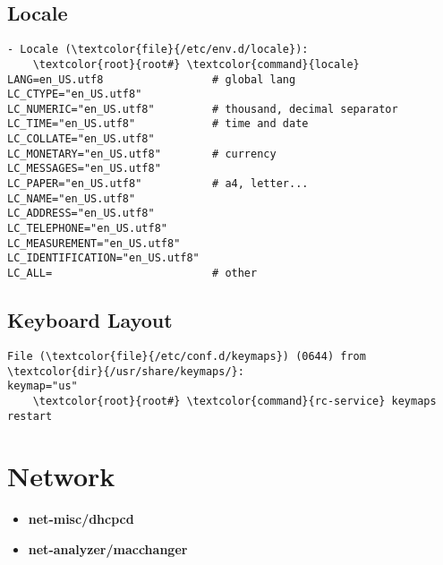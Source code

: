 \documentclass[10pt, a4paper, onecolumn, openany]{book}         %
\begin{document}
\section{Locale}
\begin{Verbatim}[commandchars=\\\{\}]
- Locale (\textcolor{file}{/etc/env.d/locale}):
    \textcolor{root}{root#} \textcolor{command}{locale}
LANG=en_US.utf8                 # global lang
LC_CTYPE="en_US.utf8"           
LC_NUMERIC="en_US.utf8"         # thousand, decimal separator
LC_TIME="en_US.utf8"            # time and date
LC_COLLATE="en_US.utf8"
LC_MONETARY="en_US.utf8"        # currency
LC_MESSAGES="en_US.utf8"
LC_PAPER="en_US.utf8"           # a4, letter...
LC_NAME="en_US.utf8"
LC_ADDRESS="en_US.utf8"
LC_TELEPHONE="en_US.utf8"
LC_MEASUREMENT="en_US.utf8"
LC_IDENTIFICATION="en_US.utf8"  
LC_ALL=                         # other
\end{Verbatim}

\section{Keyboard Layout}
\begin{Verbatim}[commandchars=\\\{\}]
File (\textcolor{file}{/etc/conf.d/keymaps}) (0644) from \textcolor{dir}{/usr/share/keymaps/}:
keymap="us"
    \textcolor{root}{root#} \textcolor{command}{rc-service} keymaps restart
\end{Verbatim}


\chapter{Network}%
\begin{itemize}
    \item \textbf{net-misc/dhcpcd}
    \item \textbf{net-analyzer/macchanger}
\end{itemize}
\end{document}
